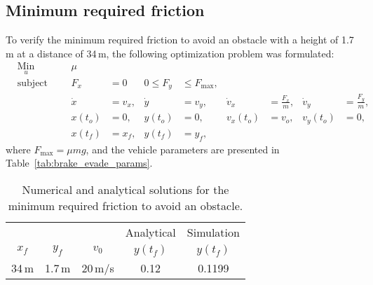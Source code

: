 \subsection{Minimum required friction}
To verify the minimum required friction to avoid an obstacle with a height of 1.7\,m at a distance of 34\,m, the following optimization problem was formulated:
\begin{align}
    & \underset{u}{\text{Min}}
    & & & \mu\\
%
    & \text{subject to} 
    & & & F_x &= 0 &0 \leq F_y &\leq F_{\text{max}},\\
%
    &&& & \dot x &= v_x, & \dot y &= v_y, & \dot v_x &= \frac{F_x}{m}, & \dot v_y &= \frac{F_y}{m},\\
%
    &&& & x(t_o) &= 0, & y(t_o) &= 0, & v_x(t_o) &= v_o, & v_y(t_o) &= 0,\\
    &&& & x(t_f) &= x_f, & y(t_f) &= y_f,
\end{align}
where $F_{\text{max}} = \mu m g$, and the vehicle parameters are presented in Table~\ref{tab:brake_evade_params}.
\begin{table}[h!]
    \centering
    \begin{tabular}{c|c|c|c|c}
        & & & Analytical & Simulation\\
        $x_f$ & $y_f$ & $v_0$ & $y(t_f)$ & $y(t_f)$ \\
        \hline
        34\,m & 1.7\,m & 20\,m/s & 0.12 & 0.1199 \\
    \end{tabular}
    \caption{Numerical and analytical solutions for the minimum required friction to avoid an obstacle.}
\end{table}
